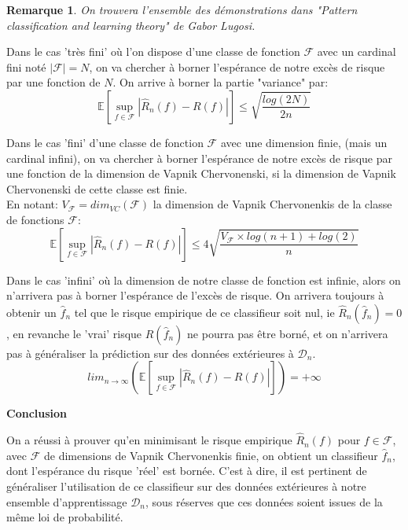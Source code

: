 \documentclass[a4paper]{article}
\theoremstyle{plain}
\newtheorem*{remark*}{Remarque}
\begin{document}
\begin{remark*} On trouvera l'ensemble des démonstrations dans "Pattern classification and learning theory" de Gabor Lugosi.
 \end{remark*}

Dans le cas 'très fini' où l'on dispose d'une classe de fonction $\mathcal{F}$ avec un cardinal fini noté $|\mathcal{F}|=N$, on va chercher à borner l'espérance de notre excès de risque par une fonction de $N$. On arrive à borner la partie "variance" par:\\

$$\mathbb{E}[\sup_{f \in \mathcal{F}} |\hat R_n(f) - R(f)|] \leq \sqrt{\frac{log(2N)}{2n}}$$

Dans le cas 'fini' d'une classe de fonction $\mathcal{F}$ avec une dimension finie, (mais un cardinal infini), on va chercher à borner l'espérance de notre excès de risque par une fonction de la dimension de Vapnik Chervonenski, si la dimension de Vapnik Chervonenski de cette classe est finie.\\

En notant: $ V_{\mathcal{F}} = dim_{VC}(\mathcal{F})$ la dimension de Vapnik Chervonenkis de la classe de fonctions $\mathcal{F}$:
$$\mathbb{E}[\sup_{f \in \mathcal{F}} |\hat R_n(f) - R(f)|] \leq 4 \sqrt{\frac{V_{\mathcal{F}} \times log(n+1)+log(2)}{n}}$$

Dans le cas 'infini' où la dimension de notre classe de fonction est infinie, alors on n'arrivera pas à borner l'espérance de l'excès de risque. On arrivera toujours à obtenir un $\hat f_n$ tel que le risque empirique de ce classifieur soit nul, ie $\hat R_n(\hat f_n) = 0$, en revanche le 'vrai' risque $R(\hat f_n)$ ne pourra pas être borné, et on n'arrivera pas à généraliser la prédiction sur des données extérieures à $\mathcal{D}_n$.
\\
$$lim_{n \to \infty} \left(\mathbb{E}[\sup_{f \in \mathcal{F}} |\hat R_n(f) - R(f)|] \right) = + \infty $$

\textbf{Conclusion} 

On a réussi à prouver qu'en minimisant le risque empirique $\hat R_n(f)$ pour $f \in \mathcal{F}$, avec $\mathcal{F}$ de dimensions de Vapnik Chervonenkis finie, on obtient un classifieur $\hat f_n$, dont l'espérance du risque 'réel' est bornée. C'est à dire, il est pertinent de généraliser l'utilisation de ce classifieur sur des données extérieures à notre ensemble d'apprentissage $\mathcal{D}_n$, sous réserves que ces données soient issues de la même loi de probabilité.\\
\end{document}

